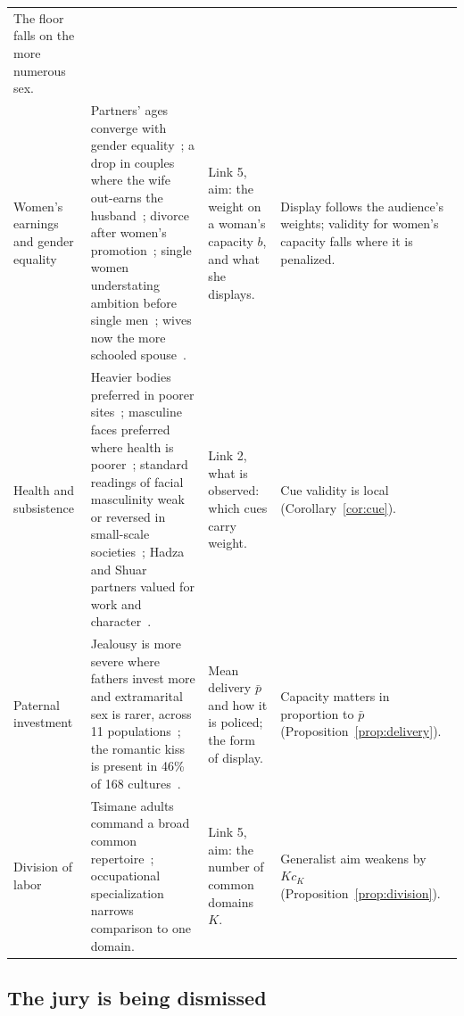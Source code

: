 \begin{table}[t]
\begin{tabularx}{\textwidth}{@{}P{0.13\textwidth}LP{0.25\textwidth}P{0.17\textwidth}@{}}
The floor falls on the more numerous sex.\\
Women's earnings and gender equality &
Partners' ages converge with gender equality~\cite{walter2020}; a drop in couples where the wife out-earns the
husband~\cite{bertrand2015}; divorce after women's promotion~\cite{folke2020}; single women understating ambition before
single men~\cite{bursztyn2017}; wives now the more schooled spouse~\cite{esteve2016}. &
Link 5, aim: the weight on a woman's capacity $b$, and what she displays. &
Display follows the audience's weights; validity for women's capacity falls where it is penalized.\\
Health and subsistence &
Heavier bodies preferred in poorer sites~\cite{swami2010}; masculine faces preferred where health is
poorer~\cite{debruine2010}; standard readings of facial masculinity weak or reversed in small-scale
societies~\cite{scott2014}; Hadza and Shuar partners valued for work and character~\cite{marlowe2004,pillsworth2008}. &
Link 2, what is observed: which cues carry weight. &
Cue validity is local (Corollary~\ref{cor:cue}).\\
Paternal investment &
Jealousy is more severe where fathers invest more and extramarital sex is rarer, across 11
populations~\cite{scelza2020}; the romantic kiss is present in 46\% of 168 cultures~\cite{jankowiak2015}. &
Mean delivery $\bar p$ and how it is policed; the form of display. &
Capacity matters in proportion to $\bar p$ (Proposition~\ref{prop:delivery}).\\
Division of labor &
Tsimane adults command a broad common repertoire~\cite{schniter2015}; occupational specialization narrows comparison to one
domain. &
Link 5, aim: the number of common domains $K$. &
Generalist aim weakens by $Kc_K$ (Proposition~\ref{prop:division}).\\
\bottomrule
\end{tabularx}
\end{table}

\subsection{The jury is being dismissed}\label{sec:resvillage}

